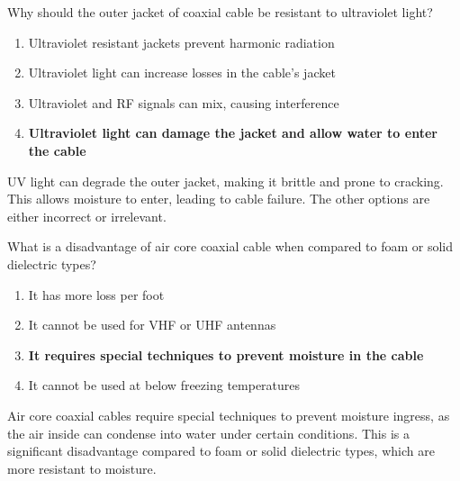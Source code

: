 \begin{tcolorbox}[colback=gray!10!white,colframe=black!75!black,title={T7C10}]
    Why should the outer jacket of coaxial cable be resistant to ultraviolet light?
    \begin{enumerate}[label=\Alph*),noitemsep]
        \item Ultraviolet resistant jackets prevent harmonic radiation
        \item Ultraviolet light can increase losses in the cable’s jacket
        \item Ultraviolet and RF signals can mix, causing interference
        \item \textbf{Ultraviolet light can damage the jacket and allow water to enter the cable}
    \end{enumerate}
\end{tcolorbox}
UV light can degrade the outer jacket, making it brittle and prone to cracking. This allows moisture to enter, leading to cable failure. The other options are either incorrect or irrelevant.

\begin{tcolorbox}[colback=gray!10!white,colframe=black!75!black,title={T7C11}]
    What is a disadvantage of air core coaxial cable when compared to foam or solid dielectric types?
    \begin{enumerate}[label=\Alph*),noitemsep]
        \item It has more loss per foot
        \item It cannot be used for VHF or UHF antennas
        \item \textbf{It requires special techniques to prevent moisture in the cable}
        \item It cannot be used at below freezing temperatures
    \end{enumerate}
\end{tcolorbox}
Air core coaxial cables require special techniques to prevent moisture ingress, as the air inside can condense into water under certain conditions. This is a significant disadvantage compared to foam or solid dielectric types, which are more resistant to moisture.
